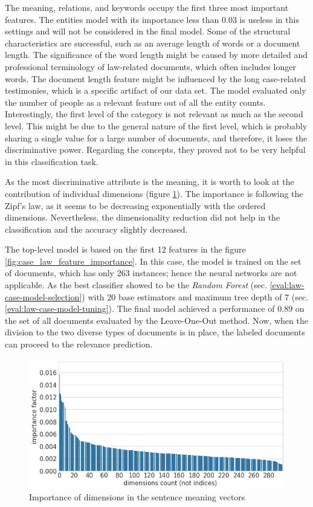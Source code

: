 \documentclass[
  digital, %
  notable,   %
  nolof,     %
  nolot,     %
]{fithesis3}
\begin{document}
The meaning, relations, and keywords occupy the first three most important features.
The entities model with its importance less than $0.03$ is useless in this settings and will not be considered in the final model.
Some of the structural characteristics are successful, such as an average length of words or a document length.
The significance of the word length might be caused by more detailed and professional terminology of law-related documents, which often includes longer words.
The document length feature might be influenced by the long case-related testimonies, which is a specific artifact of our data set.
The model evaluated only the number of people as a relevant feature out of all the entity counts.
Interestingly, the first level of the category is not relevant as much as the second level.
This might be due to the general nature of the first level, which is probably sharing a single value for a large number of documents, and therefore, it loses the discriminative power.
Regarding the concepts, they proved not to be very helpful in this classification task.

As the most discriminative attribute is the meaning, it is worth to look at the contribution of individual dimensions (figure \ref{fig:vec_importance_caselaw}).
The importance is following the Zipf's law, as it seems to be decreasing exponentially with the ordered dimensions.
Nevertheless, the dimensionality reduction did not help in the classification and the accuracy slightly decreased.

The top-level model is based on the first 12 features in the figure \ref{fig:case_law_feature_importance}.
In this case, the model is trained on the set of documents, which has only 263 instances; hence the neural networks are not applicable.
As the best classifier showed to be the \textit{Random Forest} (sec. \ref{eval:law-case-model-selection}) with 20 base estimators and maximum tree depth of 7 (sec. \ref{eval:law-case-model-tuning}). The final model achieved a performance of $0.89$ on the set of all documents evaluated by the Leave-One-Out method. Now, when the division to the two diverse types of documents is in place, the labeled documents can proceed to the relevance prediction.

\begin{figure}[H]
\caption{Importance of dimensions in the sentence meaning vectors}
\label{fig:vec_importance_caselaw}
\includegraphics[width=\textwidth]{img/vec_importance_caselaw}
\end{figure}
\end{document}
